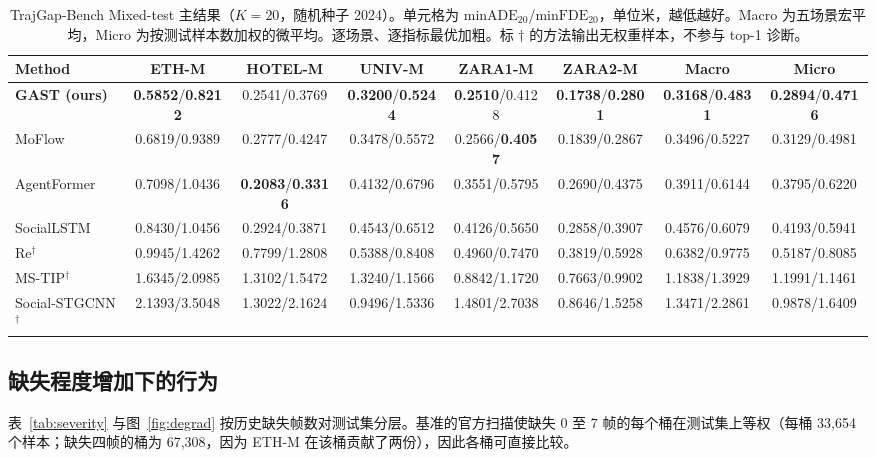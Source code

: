 \begin{table}[t]
\centering
\scriptsize
\setlength{\tabcolsep}{2.4pt}
\caption{TrajGap-Bench Mixed-test 主结果（$K=20$，随机种子 2024）。单元格为 $\mathrm{minADE}_{20}$/$\mathrm{minFDE}_{20}$，单位米，越低越好。Macro 为五场景宏平均，Micro 为按测试样本数加权的微平均。逐场景、逐指标最优加粗。标 $\dagger$ 的方法输出无权重样本，不参与 top-1 诊断。}
\label{tab:main}
\begin{tabular}{@{}lccccccc@{}}
\toprule
Method & ETH-M & HOTEL-M & UNIV-M & ZARA1-M & ZARA2-M & Macro & Micro \\
\midrule
\textbf{GAST (ours)} & \textbf{0.5852}/\textbf{0.8212} & 0.2541/0.3769 & \textbf{0.3200}/\textbf{0.5244} & \textbf{0.2510}/0.4128 & \textbf{0.1738}/\textbf{0.2801} & \textbf{0.3168}/\textbf{0.4831} & \textbf{0.2894}/\textbf{0.4716} \\
MoFlow & 0.6819/0.9389 & 0.2777/0.4247 & 0.3478/0.5572 & 0.2566/\textbf{0.4057} & 0.1839/0.2867 & 0.3496/0.5227 & 0.3129/0.4981 \\
AgentFormer & 0.7098/1.0436 & \textbf{0.2083}/\textbf{0.3316} & 0.4132/0.6796 & 0.3551/0.5795 & 0.2690/0.4375 & 0.3911/0.6144 & 0.3795/0.6220 \\
SocialLSTM & 0.8430/1.0456 & 0.2924/0.3871 & 0.4543/0.6512 & 0.4126/0.5650 & 0.2858/0.3907 & 0.4576/0.6079 & 0.4193/0.5941 \\
Re$^{\dagger}$ & 0.9945/1.4262 & 0.7799/1.2808 & 0.5388/0.8408 & 0.4960/0.7470 & 0.3819/0.5928 & 0.6382/0.9775 & 0.5187/0.8085 \\
MS-TIP$^{\dagger}$ & 1.6345/2.0985 & 1.3102/1.5472 & 1.3240/1.1566 & 0.8842/1.1720 & 0.7663/0.9902 & 1.1838/1.3929 & 1.1991/1.1461 \\
Social-STGCNN$^{\dagger}$ & 2.1393/3.5048 & 1.3022/2.1624 & 0.9496/1.5336 & 1.4801/2.7038 & 0.8646/1.5258 & 1.3471/2.2861 & 0.9878/1.6409 \\
\bottomrule
\end{tabular}
\end{table}

\subsection{缺失程度增加下的行为}
\label{sec:severity}

表~\ref{tab:severity} 与图~\ref{fig:degrad} 按历史缺失帧数对测试集分层。基准的官方扫描使缺失 $0$ 至 $7$ 帧的每个桶在测试集上等权（每桶 33{,}654 个样本；缺失四帧的桶为 67{,}308，因为 ETH-M 在该桶贡献了两份），因此各桶可直接比较。

